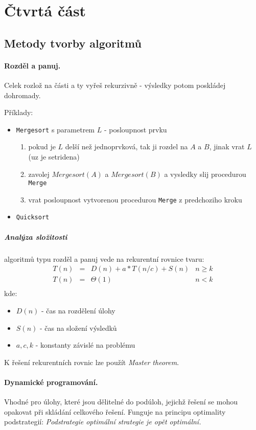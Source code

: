 \documentclass[a4paper]{article}      %
\begin{document}
\section{Čtvrtá část}

\subsection{Metody tvorby algoritmů}

\paragraph{Rozděl a panuj.}
Celek rozlož na části a ty vyřeš rekurzivně - výsledky potom poskládej dohromady.

Příklady:

\begin{itemize}
\item \verb+Mergesort+ s parametrem $L$ - posloupnost prvku
	\begin{enumerate}
	\item pokud je $L$ delší než jednoprvková, tak ji rozdel na $A$ a $B$, jinak vrat $L$ (uz je setridena)
	\item zavolej $Mergesort(A)$ a $Mergesort(B)$ a vysledky slij procedurou \verb+Merge+
	\item vrat posloupnost vytvorenou procedurou \verb+Merge+ z predchoziho kroku 
	\end{enumerate}
\item \verb+Quicksort+
\end{itemize}

\subparagraph{Analýza složitosti} algoritmů typu rozděl a panuj vede na rekurentní rovnice tvaru:
\[
\begin{array}{lclr}
T(n) & = & D(n) + a*T(n/c) + S(n) & n \geq k\\
T(n) & = & \Theta(1) & n < k\\		
\end{array}
\]
kde:
\begin{itemize}
\item $D(n)$ - čas na rozdělení úlohy
\item $S(n)$ - čas na složení výsledků
\item $a,c,k$ - konstanty závislé na problému
\end{itemize}
K řešení rekurentních rovnic lze použít \emph{Master theorem}.

\paragraph{Dynamické programování.}
Vhodné pro úlohy, které jsou dělitelné do podúloh, jejichž řešení se mohou opakovat při skládání celkového řešení. Funguje na principu optimality podstrategií: \emph{Podstrategie optimální strategie je opět optimální.}
\end{document}
